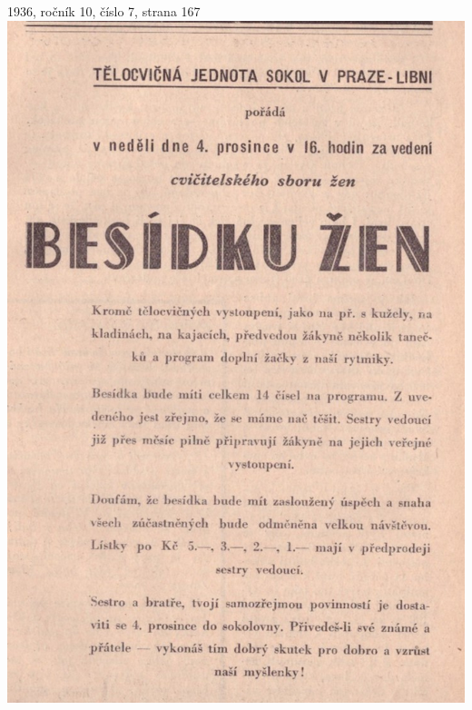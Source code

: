 \documentclass[11pt]{article}
\begin{document}
1936, ročník 10, číslo 7, strana 167 \\
\includegraphics[width=\imagewidth]{original/1936/Skener_20250323 (5).jpg}



\end{document}
